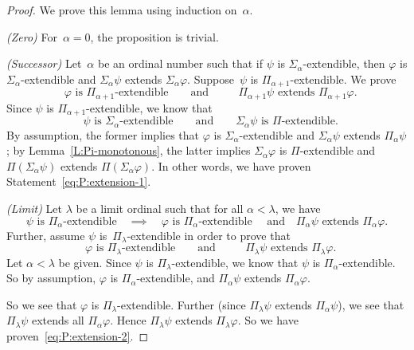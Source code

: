 \documentclass[main.tex]{subfiles}
\begin{document}
\begin{proof}
We prove this lemma using induction on~$\alpha$.

\noindent\emph{(Zero)} For~$\alpha=0$, the proposition is trivial.

\noindent\emph{(Successor)} Let~$\alpha$ be an ordinal number such that
if $\psi$ is $\Sigma_\alpha$-extendible,
then
$\varphi$ is $\Sigma_\alpha$-extendible 
and $\Sigma_\alpha\psi$ extends $\Sigma_\alpha\varphi$.
Suppose~$\psi$
is $\Pi_{\alpha+1}$-extendible.
We prove
\begin{equation}
\label{eq:P:extension-1}
\text{ $\varphi$ is $\Pi_{\alpha+1}$-extendible}
\qquad\text{and}\qquad
\text{ $\Pi_{\alpha+1}\psi$ extends $\Pi_{\alpha+1}\varphi$.}
\end{equation}
Since $\psi$ is $\Pi_{\alpha+1}$-extendible,
we know that
\begin{equation*}
\text{ $\psi$ is $\Sigma_\alpha$-extendible}
\qquad\text{and}\qquad
\text{$\Sigma_\alpha\psi$ is~$\Pi$-extendible}.
\end{equation*}
By assumption, 
the former implies that $\varphi$ is $\Sigma_\alpha$-extendible
and $\Sigma_\alpha\psi$ extends $\Pi_\alpha\psi$;
by Lemma~\ref{L:Pi-monotonous},
the latter implies $\Sigma_\alpha\varphi$
is $\Pi$-extendible
and $\Pi(\Sigma_\alpha\psi)$ extends $\Pi(\Sigma_\alpha \varphi)$.
In other words,
we have proven Statement~\eqref{eq:P:extension-1}.

\noindent\emph{(Limit)}
Let $\lambda$ be a limit ordinal such that
for all $\alpha<\lambda$, we have
\begin{equation*}
\text{$\psi$ is $\Pi_\alpha$-extendible}
\quad\implies\quad
\text{$\varphi$ is $\Pi_\alpha$-extendible }
\quad\text{and}\quad
\text{$\Pi_\alpha\psi$ extends $\Pi_\alpha\varphi$.}
\end{equation*}
Further, 
assume $\psi$ is~$\Pi_\lambda$-extendible
in order to prove that
\begin{equation}
\label{eq:P:extension-2}
\text{ $\varphi$ is $\Pi_{\lambda}$-extendible}
\qquad\text{and}\qquad
\text{ $\Pi_{\lambda}\psi$ extends $\Pi_{\lambda}\varphi$.}
\end{equation}
Let $\alpha <\lambda$ be given.
Since $\psi$ is $\Pi_\lambda$-extendible,
we know that $\psi$ is $\Pi_\alpha$-extendible.
So by assumption, 
$\varphi$ is $\Pi_\alpha$-extendible,
and $\Pi_\alpha \psi$ extends $\Pi_\alpha \varphi$.

So we see that $\varphi$ is $\Pi_\lambda$-extendible.
Further
(since $\Pi_\lambda\psi$ extends $\Pi_\alpha \psi$),
we see that $\Pi_\lambda \psi$ extends all $\Pi_\alpha\varphi$.
Hence $\Pi_\lambda \psi$ extends $\Pi_\lambda \varphi$.
So we have proven~\eqref{eq:P:extension-2}.
\end{proof}
\end{document}
